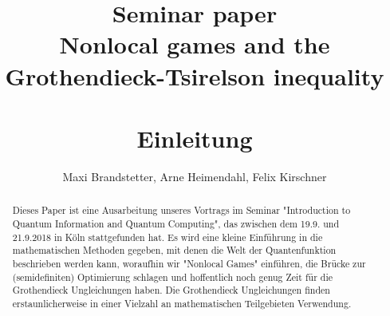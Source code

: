 

\title{Seminar paper \\ {Nonlocal games and the Grothendieck-Tsirelson inequality}
\author{Maxi Brandstetter, Arne Heimendahl, Felix Kirschner}





\begin{abstract}
Dieses Paper ist eine Ausarbeitung unseres Vortrags im Seminar "Introduction to Quantum Information and Quantum Computing", das zwischen dem 19.9. und 21.9.2018 in Köln stattgefunden hat. Es wird eine kleine Einführung in die mathematischen Methoden gegeben, mit denen die Welt der Quantenfunktion beschrieben werden kann, woraufhin wir "Nonlocal Games" einführen, die Brücke zur (semidefiniten) Optimierung schlagen und hoffentlich noch genug Zeit für die Grothendieck Ungleichungen haben. Die Grothendieck Ungleichungen finden erstaunlicherweise in einer Vielzahl an mathematischen Teilgebieten Verwendung.
\end{abstract}


\maketitle	
\tableofcontents
	
	
\newpage	
{}



\section{Einleitung}
	\vspace{8pt}
	


\let \oldsection \section
\renewcommand{\section}{\vspace{15pt plus 8pt}\oldsection}
\let \oldsubsection \subsection
\renewcommand{\subsection}{\vspace{10pt plus 3pt}\oldsubsection}



}
